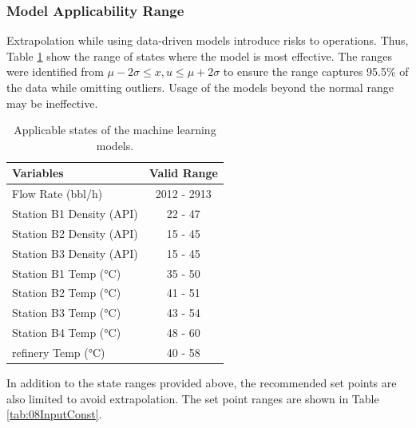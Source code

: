 \subsubsection{Model Applicability Range}
Extrapolation while using data-driven models introduce risks to operations. Thus, Table \ref{tab:08StateConst} show the range of states where the model is most effective. The ranges were identified from $\mu - 2\sigma \leq x, u \leq \mu + 2\sigma$ to ensure the range captures 95.5\% of the data while omitting outliers. Usage of the models beyond the normal range may be ineffective.

\begin{table}[h]
    \centering
    {
    \begin{tabular}{ p{5cm} | c }
        Variables                         &  Valid Range           \\
        \hline
        Flow Rate (bbl/h)                       &      2012 - 2913       \\
        Station B1 Density (API)                  &      22 - 47           \\ 
        Station B2 Density (API)                       &      15 - 45           \\
        Station B3 Density (API)                      &      15 - 45           \\
        Station B1 Temp (°C)                      &      35 - 50           \\
        Station B2 Temp (°C)                           &      41 - 51           \\
        Station B3 Temp (°C)                          &      43 - 54           \\
        Station B4 Temp (°C)                   &      48 - 60           \\
        refinery Temp  (°C)                &      40 - 58           \\
    \end{tabular}}
    \caption{Applicable states of the machine learning models.}
    \label{tab:08StateConst}
\end{table}

In addition to the state ranges provided above, the recommended set points are also limited to avoid extrapolation.  The set point ranges are shown in Table \ref{tab:08InputConst}.

